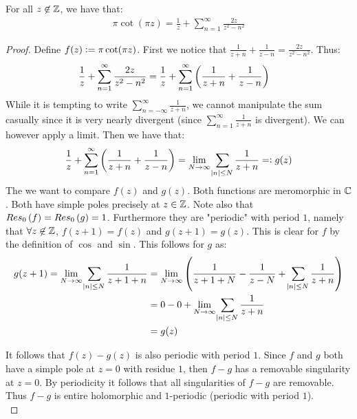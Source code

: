 \begin{proposition}[Lindel{\"o}f]
For all $z \not\in \mathbb{Z}$, we have that:
\begin{align*}
    \pi \cot(\pi z) = \frac{1}{z} + \sum_{n=1}^\infty \frac{2 z }{z^2-n^2}
\end{align*}
\end{proposition}
\begin{proof}
Define $f(z) \vcentcolon = \pi \cot(\pi z)$. First we notice that $\frac{1}{z+n} + \frac{1}{z-n} = \frac{2z}{z^2 - n^2}$. Thus:
\begin{align*}
    \frac{1}{z} + \sum_{n=1}^\infty \frac{2 z }{z^2-n^2} &= \frac{1}{z} + \sum_{n=1}^\infty \left( \frac{1}{z+n} + \frac{1}{z-n} \right)
\end{align*}
While it is tempting to write $\sum_{n=-\infty}^\infty \frac{1}{z+n}$, we cannot manipulate the sum casually since it is very nearly divergent (since $\sum_{n=1}^\infty \frac{1}{z+n}$ is divergent). We can however apply a limit. Then we have that:
\begin{align*}
    \frac{1}{z} + \sum_{n=1}^\infty \left( \frac{1}{z+n} + \frac{1}{z-n} \right) = \lim_{N \to \infty}\sum_{\abs{n} \leq N} \frac{1}{z+n} = \vcentcolon g(z)
\end{align*}
The we want to compare $f(z)$ and $g(z)$. Both functions are meromorphic in $\mathbb{C}$. Both have simple poles precisely at $z \in \mathbb{Z}$. Note also that $Res_{0} \left( f \right) = Res_{0} \left( g \right) = 1$. Furthermore they are "periodic" with period $1$, namely that $\forall z \not\in \mathbb{Z}$, $f(z+1) = f(z)$ and $g(z+1) = g(z)$. This is clear for $f$ by the definition of $\cos$ and $\sin$. This follows for $g$ as:
\begin{align*}
    g(z+1) = \lim_{N \to \infty}\sum_{\abs{n} \leq N} \frac{1}{z+1+n} &= \lim_{N \to \infty} \left(  \frac{1}{z+1+N} - \frac{1}{z-N} + \sum_{\abs{n} \leq N} \frac{1}{z+n} \right)\\
    &= 0 - 0 + \lim_{N \to \infty}\sum_{\abs{n} \leq N} \frac{1}{z+n}\\
    &= g(z)
\end{align*}

It follows that $f(z) - g(z)$ is also periodic with period $1$. Since $f$ and $g$ both have a simple pole at $z=0$ with residue $1$, then $f-g$ has a removable singularity at $z=0$. By periodicity it follows that all singularities of $f-g$ are removable. Thus $f-g$ is entire holomorphic and $1$-periodic (periodic with period $1$).\\




\end{proof}
